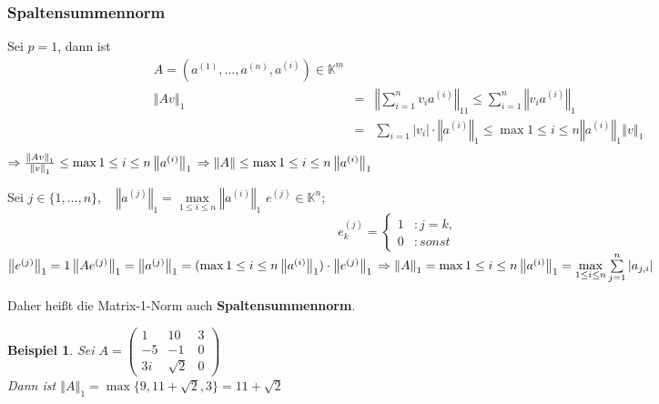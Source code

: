 \documentclass[a4paper,10pt]{scrartcl}
\newcommand{\norm}[1]{ \left\Vert #1 \right\Vert }
\newtheorem[L]{satz}{Satz}[section]
\newtheorem{bsp}{Beispiel}[section]
\newtheorem[S]{beweis}{Beweis}
\newtheorem[S]{beh}{Behauptung}
\begin{document}
\subsubsection{Spaltensummennorm}
  Sei $p = 1$, dann ist 
  \begin{eqnarray*}
  A = (a^{(1)}, \ldots, a^{(n)}, a^{(i)}) \in \mathbb{K}^m \\
  \norm{Av}_1 &=& \norm{\sum\limits_{i = 1}^n {v_i a^{(i)}}}_11 \leq \sum\limits_{i = 1}^n \norm{v_i a^{(i)}}_1\\
    &=& \sum\limits_{i = 1} |v_i| \cdot \norm{a^{(i)}}_1 \leq \max\limits{1 \leq i\leq n} \norm{a^{(i)}}_1 \norm{v}_1\\
  \end{eqnarray*}
  $\Rightarrow \frac{\norm{Av}_1}{\norm{v}_1} \leq \max\limits{1 \leq i\leq n} \norm{a^{(i)}}_1\\
  \Rightarrow \norm{A} \leq \max\limits{1 \leq i\leq n} \norm{a^{(i)}}_1$

  \bigskip

  Sei $ j \in \{1, \ldots, n\},\quad \norm{a^{(j)}}_1 = \max\limits_{1 \leq i\leq n} \norm{a^{(i)}}_1$
  $e^{(j)} \in \mathbb{K}^n; $
  \begin{equation*}
  e^{(j)}_k=
  \left\{
  \begin{aligned}
  1 &: j = k,\\
  0 &: sonst
  \end{aligned}
  \right.
  \end{equation*}
  $\norm{e^{(j)}}_1 = 1\\
  \norm{Ae^{(j)}}_1 = \norm{a^{(j)}}_1 = ( \max\limits{1 \leq i\leq n} \norm{a^{(i)}}_1) \cdot \norm{e^{(j)}}_1\\
  \Rightarrow \norm{A}_1 = \max\limits{1 \leq i\leq n} \norm{a^{(i)}}_1 = \max\limits_{1 \leq i \leq n} \sum\limits_{j = 1}^n{|a_{j,i}|}$

  \medskip

  Daher heißt die Matrix-1-Norm auch \textbf{Spaltensummennorm}.\\

  \bigskip

  \begin{bsp}
  Sei $A = 
  \begin{pmatrix}
  1 & 10 & 3\\
  -5 & -1 & 0\\
  3i & \sqrt{2} & 0
  \end{pmatrix}$\\
  Dann ist $\norm{A}_1 = \max\{9, 11 + \sqrt{2}, 3\} = 11 + \sqrt{2}$
  \end{bsp}
\end{document}
